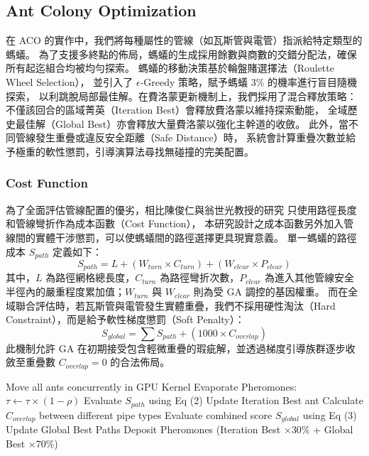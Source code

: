 \documentclass[conference]{IEEEtran}
\begin{document}
\subsection{Ant Colony Optimization}
在 ACO 的實作中，我們將每種屬性的管線（如瓦斯管與電管）指派給特定類型的螞蟻。
為了支援多終點的佈局，螞蟻的生成採用餘數與商數的交錯分配法，確保所有起迄組合均被均勻探索。
螞蟻的移動決策基於輪盤賭選擇法（Roulette Wheel Selection），
並引入了 $\epsilon$-Greedy 策略，賦予螞蟻 3\% 的機率進行盲目隨機探索，
以利跳脫局部最佳解。在費洛蒙更新機制上，我們採用了混合釋放策略：
不僅該回合的區域菁英（Iteration Best）會釋放費洛蒙以維持探索動能，
全域歷史最佳解（Global Best）亦會釋放大量費洛蒙以強化主幹道的收斂。
此外，當不同管線發生重疊或違反安全距離（Safe Distance）時，
系統會計算重疊次數並給予極重的軟性懲罰，引導演算法尋找無碰撞的完美配置。

\subsubsection{Cost Function}
為了全面評估管線配置的優劣，相比陳俊仁與翁世光教授的研究 \cite{b2}只使用路徑長度和管線彎折作為成本函數（Cost Function），
本研究設計之成本函數另外加入管線間的實體干涉懲罰，可以使螞蟻間的路徑選擇更具現實意義。
單一螞蟻的路徑成本 $S_{path}$ 定義如下：
\begin{equation}
S_{path} = L + (W_{turn} \times C_{turn}) + (W_{clear} \times P_{clear})
\end{equation}
其中，$L$ 為路徑網格總長度，$C_{turn}$ 為路徑彎折次數，$P_{clear}$ 為進入其他管線安全半徑內的嚴重程度累加值；$W_{turn}$ 與 $W_{clear}$ 則為受 GA 調控的基因權重。
而在全域聯合評估時，若瓦斯管與電管發生實體重疊，我們不採用硬性淘汰（Hard Constraint），而是給予軟性梯度懲罰（Soft Penalty）：
\begin{equation}
S_{global} = \sum S_{path} + (1000 \times C_{overlap})
\end{equation}
此機制允許 GA 在初期接受包含輕微重疊的瑕疵解，並透過梯度引導族群逐步收斂至重疊數 $C_{overlap} = 0$ 的合法佈局。

\begin{algorithm}[!ht]
\caption{Parallel ACO Routing with Soft Penalty}
\begin{algorithmic}[1]
    \STATE Move all ants concurrently in GPU Kernel
    \STATE Evaporate Pheromones: $\tau \leftarrow \tau \times (1 - \rho)$
        \STATE Evaluate $S_{path}$ using Eq (2)
        \STATE Update Iteration Best ant
    \ENDFOR
        \STATE Calculate $C_{overlap}$ between different pipe types
        \STATE Evaluate combined score $S_{global}$ using Eq (3)
            \STATE Update Global Best Paths
        \ENDIF
    \ENDIF
    \STATE Deposit Pheromones (Iteration Best $\times 30\%$ + Global Best $\times 70\%$)
\ENDFOR
\end{algorithmic}
\end{algorithm}
\end{document}
